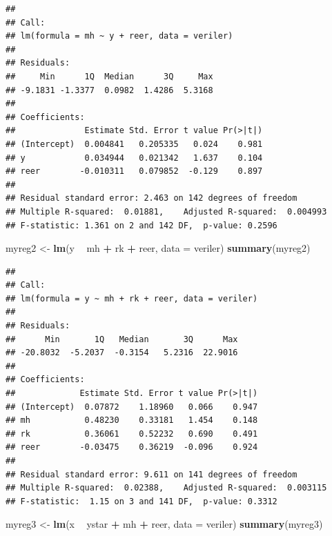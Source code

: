 \documentclass[]{article}
\newenvironment{Shaded}{\begin{snugshade}}{\end{snugshade}}
\newcommand{\KeywordTok}[1]{\textcolor[rgb]{0.13,0.29,0.53}{\textbf{#1}}}
\newcommand{\DataTypeTok}[1]{\textcolor[rgb]{0.13,0.29,0.53}{#1}}
\newcommand{\StringTok}[1]{\textcolor[rgb]{0.31,0.60,0.02}{#1}}
\newcommand{\OperatorTok}[1]{\textcolor[rgb]{0.81,0.36,0.00}{\textbf{#1}}}
\newcommand{\NormalTok}[1]{#1}
\begin{document}
\begin{verbatim}
## 
## Call:
## lm(formula = mh ~ y + reer, data = veriler)
## 
## Residuals:
##     Min      1Q  Median      3Q     Max 
## -9.1831 -1.3377  0.0982  1.4286  5.3168 
## 
## Coefficients:
##              Estimate Std. Error t value Pr(>|t|)
## (Intercept)  0.004841   0.205335   0.024    0.981
## y            0.034944   0.021342   1.637    0.104
## reer        -0.010311   0.079852  -0.129    0.897
## 
## Residual standard error: 2.463 on 142 degrees of freedom
## Multiple R-squared:  0.01881,    Adjusted R-squared:  0.004993 
## F-statistic: 1.361 on 2 and 142 DF,  p-value: 0.2596
\end{verbatim}

\begin{Shaded}
\begin{Highlighting}[]
\NormalTok{myreg2 <-}\StringTok{ }\KeywordTok{lm}\NormalTok{(y }\OperatorTok{~}\StringTok{ }\NormalTok{mh }\OperatorTok{+}\StringTok{ }\NormalTok{rk }\OperatorTok{+}\StringTok{ }\NormalTok{reer, }\DataTypeTok{data =}\NormalTok{ veriler)}
\KeywordTok{summary}\NormalTok{(myreg2)}
\end{Highlighting}
\end{Shaded}

\begin{verbatim}
## 
## Call:
## lm(formula = y ~ mh + rk + reer, data = veriler)
## 
## Residuals:
##      Min       1Q   Median       3Q      Max 
## -20.8032  -5.2037  -0.3154   5.2316  22.9016 
## 
## Coefficients:
##             Estimate Std. Error t value Pr(>|t|)
## (Intercept)  0.07872    1.18960   0.066    0.947
## mh           0.48230    0.33181   1.454    0.148
## rk           0.36061    0.52232   0.690    0.491
## reer        -0.03475    0.36219  -0.096    0.924
## 
## Residual standard error: 9.611 on 141 degrees of freedom
## Multiple R-squared:  0.02388,    Adjusted R-squared:  0.003115 
## F-statistic:  1.15 on 3 and 141 DF,  p-value: 0.3312
\end{verbatim}

\begin{Shaded}
\begin{Highlighting}[]
\NormalTok{myreg3 <-}\StringTok{ }\KeywordTok{lm}\NormalTok{(x }\OperatorTok{~}\StringTok{ }\NormalTok{ystar }\OperatorTok{+}\StringTok{ }\NormalTok{mh }\OperatorTok{+}\StringTok{ }\NormalTok{reer, }\DataTypeTok{data =}\NormalTok{ veriler)}
\KeywordTok{summary}\NormalTok{(myreg3)}
\end{Highlighting}
\end{Shaded}
\end{document}
